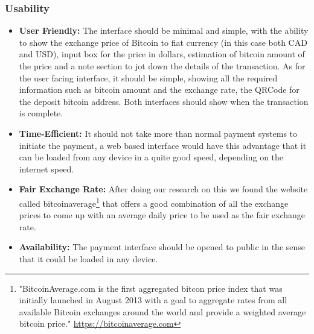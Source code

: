 \subsubsection{Usability} 
\begin{itemize}

\item \textbf{User Friendly: } The interface should be minimal and simple, with the ability to show the exchange price of Bitcoin to fiat currency (in this case both CAD and USD), input box for the price in dollars, estimation of bitcoin amount of the price and a note section to jot down the details of the transaction.
As for the user facing interface, it should be simple, showing all the required information such as bitcoin amount and the exchange rate, the QRCode for the deposit bitcoin address. Both interfaces should show when the transaction is complete.

\item \textbf{Time-Efficient: } It should not take more than normal payment systems to initiate the payment, a web based interface would have this advantage that it can be loaded from any device in a quite good speed, depending on the internet speed.

\item \textbf{Fair Exchange Rate: } After doing our research on this we found the website called bitcoinaverage\footnote{"BitcoinAverage.com is the first aggregated bitcon price index that was initially launched in August 2013 with a goal to aggregate rates from all available Bitcoin exchanges around the world and provide a weighted average bitcoin price." \url{https://bitcoinaverage.com}} that offers a good combination of all the exchange prices to come up with an average daily price to be used as the fair exchange rate.

\item \textbf{Availability: } The payment interface should be opened to public in the sense that it could be loaded in any device. 

\end{itemize}
